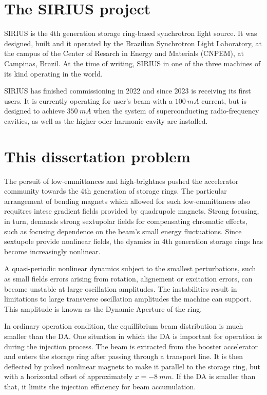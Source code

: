 \section{The SIRIUS project}
SIRIUS is the 4th generation storage ring-based synchrotron light source. It was designed, built and it operated by the Brazilian Synchrotron Light Laboratory, at the campus of the Center of Resarch in Energy and Materials (CNPEM), at Campinas, Brazil. At the time of writing, SIRIUS in one of the three machines of its kind operating in the world.

SIRIUS has finished commissioning in 2022 and since 2023 is receiving its first users. It is currently operating for user's beam with a $100~\unit{mA}$ current, but is designed to achieve $350~\unit{mA}$ when the system of superconducting radio-frequency cavities, as well as the higher-oder-harmonic cavity are installed.

\section{This dissertation problem}
    The persuit of low-emmittances and high-brightnes pushed the accelerator community towards the 4th generation of storage rings. The particular arrangement of bending magnets which allowed for such low-emmittances also requitres intese gradient fields provided by quadrupole magnets. Strong focusing, in turn, demands strong sextupolar fields for compensating chromatic effects, such as focusing dependence on the beam's small energy fluctuations. Since sextupole provide nonlinear fields, the dyamics in 4th generation storage rings has become increasingly nonlinear.

    A quasi-periodic nonlinear dynamics subject to the smallest perturbations, such as small fields errors arising from rotation, alignement or excitation errors, can become unstable at large oscillation amplitudes. The instabilities result in limitations to large transverse oscillation amplitudes the machine can support. This amplitude is known as the Dynamic Aperture of the ring.

    In ordinary operation condition, the equillibrium beam distribution is much smaller than the DA. One situation in which the DA is important for operation is during the injection process. The beam is extracted from the booster accelerator and enters the storage ring after passing through a transport line. It is then deflected by pulsed nonlinear magnets to make it parallel to the storage ring, but with a horizontal offset of approximately $x=-8~\unit{mm}$. If the DA is smaller than that, it limits the injection efficiency for beam accumulation.


